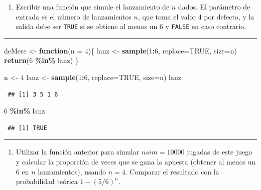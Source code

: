 \documentclass[
  spanish,
  10pt,
]{book}
\newenvironment{Shaded}{\begin{snugshade}}{\end{snugshade}}
\newcommand{\AttributeTok}[1]{\textcolor[rgb]{0.13,0.29,0.53}{#1}}
\newcommand{\ConstantTok}[1]{\textcolor[rgb]{0.56,0.35,0.01}{#1}}
\newcommand{\ControlFlowTok}[1]{\textcolor[rgb]{0.13,0.29,0.53}{\textbf{#1}}}
\newcommand{\DecValTok}[1]{\textcolor[rgb]{0.00,0.00,0.81}{#1}}
\newcommand{\FunctionTok}[1]{\textcolor[rgb]{0.13,0.29,0.53}{\textbf{#1}}}
\newcommand{\NormalTok}[1]{#1}
\newcommand{\OtherTok}[1]{\textcolor[rgb]{0.56,0.35,0.01}{#1}}
\newcommand{\SpecialCharTok}[1]{\textcolor[rgb]{0.81,0.36,0.00}{\textbf{#1}}}
\providecommand{\tightlist}{%
  \setlength{\itemsep}{0pt}\setlength{\parskip}{0pt}}
\theoremstyle{break}
\theoremstyle{nonumberplain}
\begin{document}
\begin{enumerate}
\def\labelenumi{\alph{enumi})}
\tightlist
\item
  Escribir una función que simule el lanzamiento de \(n\) dados. El
  parámetro de entrada es el número de lanzamientos \(n\), que toma
  el valor 4 por defecto, y la salida debe ser \texttt{TRUE} si se
  obtiene al menos un 6 y \texttt{FALSE} en caso contrario.
\end{enumerate}

\begin{center}\rule{0.5\linewidth}{0.5pt}\end{center}

\begin{Shaded}
\begin{Highlighting}[]
\NormalTok{deMere }\OtherTok{\textless{}{-}} \ControlFlowTok{function}\NormalTok{(}\AttributeTok{n =} \DecValTok{4}\NormalTok{)\{}
\NormalTok{  lanz }\OtherTok{\textless{}{-}} \FunctionTok{sample}\NormalTok{(}\DecValTok{1}\SpecialCharTok{:}\DecValTok{6}\NormalTok{, }\AttributeTok{replace=}\ConstantTok{TRUE}\NormalTok{, }\AttributeTok{size=}\NormalTok{n)}
  \FunctionTok{return}\NormalTok{(}\DecValTok{6} \SpecialCharTok{\%in\%}\NormalTok{ lanz)}
\NormalTok{\}}

\NormalTok{n }\OtherTok{\textless{}{-}} \DecValTok{4}
\NormalTok{lanz }\OtherTok{\textless{}{-}} \FunctionTok{sample}\NormalTok{(}\DecValTok{1}\SpecialCharTok{:}\DecValTok{6}\NormalTok{, }\AttributeTok{replace=}\ConstantTok{TRUE}\NormalTok{, }\AttributeTok{size=}\NormalTok{n)}
\NormalTok{lanz}
\end{Highlighting}
\end{Shaded}

\begin{verbatim}
 ## [1] 3 5 1 6
\end{verbatim}

\begin{Shaded}
\begin{Highlighting}[]
\DecValTok{6} \SpecialCharTok{\%in\%}\NormalTok{ lanz}
\end{Highlighting}
\end{Shaded}

\begin{verbatim}
 ## [1] TRUE
\end{verbatim}

\begin{center}\rule{0.5\linewidth}{0.5pt}\end{center}

\begin{enumerate}
\def\labelenumi{\alph{enumi})}
\setcounter{enumi}{1}
\tightlist
\item
  Utilizar la función anterior para simular \(nsim=10000\) jugadas
  de este juego y calcular la proporción de veces que se gana la
  apuesta (obtener al menos un 6 en \(n\) lanzamientos), usando
  \(n=4\). Comparar el resultado con la probabilidad teórica
  \(1-(5/6)^{n}\).
\end{enumerate}
\end{document}
